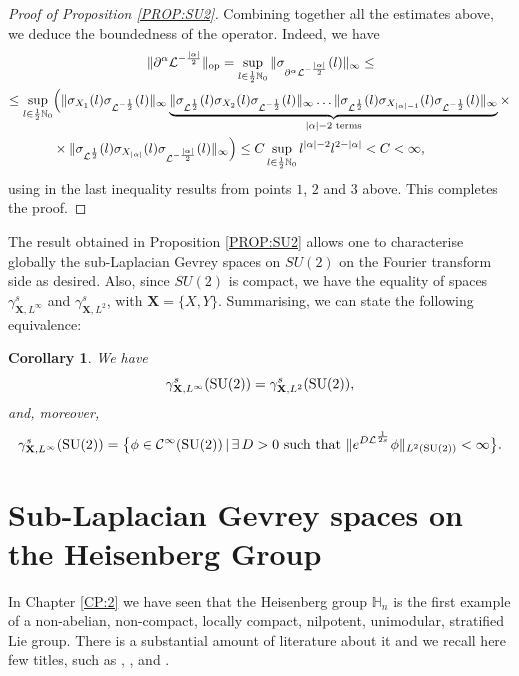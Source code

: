 \documentclass[12pt,oneside,a4paper]{book}
\numberwithin{equation}{section}     %
\theoremstyle{plain}
\newtheorem{cor}[theorem]{Corollary}
\theoremstyle{definition}
\DeclareMathOperator{\OP}{op}
\newcommand{\N}{{\mathbb N}}
\newcommand{\slp}{{\mathcal L}}
\newcommand{\SU}{{\rm SU(2)}}
\begin{document}
\begin{proof}[Proof of Proposition \ref{PROP:SU2}]
	Combining together all the estimates above, we deduce the boundedness of the operator. Indeed, we have
	\begin{align*}
	&\hspace{2.5cm}\|\partial^{\alpha}\slp^{-\frac{|\alpha|}{2}}\|_{\OP}=\sup_{l\in\frac{1}{2}\N_0}\|\sigma_{\partial^{\alpha}\slp^{-\frac{|\alpha|}{2}}}(l)\|_{\infty}\leq\\
	\leq\sup_{l\in\frac{1}{2}\N_0}&\Big(\|\sigma_{X_1}(l)\sigma_{\slp^{-\frac{1}{2}}}(l)\|_{\infty}
	\underbrace{\|\sigma_{\slp^\frac{1}{2}}(l)\sigma_{X_2}(l)\sigma_{\slp^{-\frac{1}{2}}}(l)\|_{\infty}\dots\|\sigma_{\slp^\frac{1}{2}}(l)\sigma_{X_{|\alpha|-1}}(l)\sigma_{\slp^{-\frac{1}{2}}}(l)\|_{\infty}}_{|\alpha|-2\text{ terms}}\times\\
	&\times \|\sigma_{\slp^\frac{1}{2}}(l)\sigma_{X_{|\alpha|}}(l)\sigma_{\slp^{-\frac{|\alpha|}{2}}}(l)\|_{\infty}\Big )\leq C \sup_{l\in\frac{1}{2}\N_0}l^{|\alpha|-2}l^{2-|\alpha|}<C<\infty,
	\end{align*}  
	using in the last inequality results from points $1$, $2$ and $3$ above.
	This completes the proof.
\end{proof}

The result obtained in Proposition \ref{PROP:SU2} allows one to characterise globally the sub-Laplacian Gevrey spaces on $SU(2)$ on the Fourier transform side as desired. 
Also, since $SU(2)$ is compact, we have the equality of spaces $\gamma^s_{\mathbf{X},L^{\infty}}$ and $\gamma^s_{\mathbf{X},L^2}$, with $\mathbf{X}=\{X,Y\}$.
Summarising, we can state the following equivalence:
\begin{cor} \label{COR:su2}
	We have $$\gamma^s_{\mathbf{X},L^{\infty}}(\SU)=\gamma^s_{\mathbf{X},L^2}(\SU),$$ and, moreover,
	\begin{align*}
	\gamma^s_{\mathbf{X},L^{\infty}}(\SU)=\big\{\phi\in\mathcal C^\infty(\SU)\,|\, \exists \,D>0\text{ such that }\|e^{D\slp^{\frac{1}{2s}}}\phi\|_{L^2(\SU)}<\infty\big\}.
	\end{align*}
\end{cor}

\section{Sub-Laplacian Gevrey spaces on the Heisenberg Group}
\label{SEC:heis}

In Chapter \ref{CP:2} we have seen that the Heisenberg group $\mathbb H_n$ is the first example of a non-abelian, non-compact, locally compact, nilpotent, unimodular, stratified Lie group. There is a substantial amount of literature about it and we recall here few titles, such as \cite{FH1987}, \cite{FR2016}, \cite{Fol} and \cite{T1998}.
\end{document}
